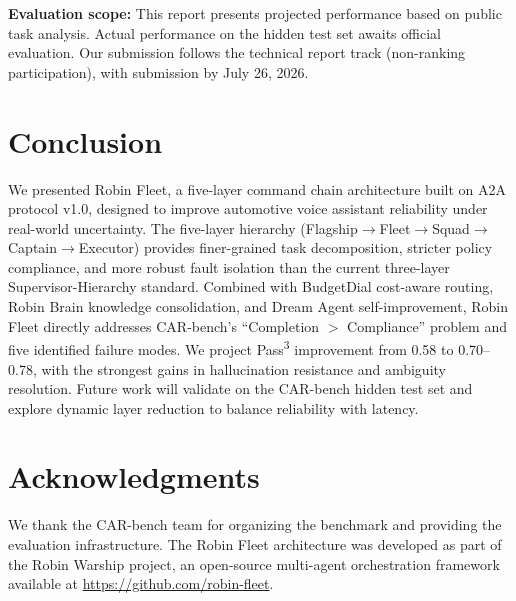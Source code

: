 \documentclass{article}
\begin{document}
\textbf{Evaluation scope:} This report presents projected performance based on public task analysis. Actual performance on the hidden test set awaits official evaluation. Our submission follows the technical report track (non-ranking participation), with submission by July 26, 2026.

\section{Conclusion}

We presented Robin Fleet, a five-layer command chain architecture built on A2A protocol v1.0, designed to improve automotive voice assistant reliability under real-world uncertainty. The five-layer hierarchy (Flagship$\rightarrow$Fleet$\rightarrow$Squad$\rightarrow$Captain$\rightarrow$Executor) provides finer-grained task decomposition, stricter policy compliance, and more robust fault isolation than the current three-layer Supervisor-Hierarchy standard. Combined with BudgetDial cost-aware routing, Robin Brain knowledge consolidation, and Dream Agent self-improvement, Robin Fleet directly addresses CAR-bench's ``Completion $>$ Compliance'' problem and five identified failure modes. We project Pass\textsuperscript{3} improvement from 0.58 to 0.70--0.78, with the strongest gains in hallucination resistance and ambiguity resolution. Future work will validate on the CAR-bench hidden test set and explore dynamic layer reduction to balance reliability with latency.

\section*{Acknowledgments}

We thank the CAR-bench team for organizing the benchmark and providing the evaluation infrastructure. The Robin Fleet architecture was developed as part of the Robin Warship project, an open-source multi-agent orchestration framework available at \url{https://github.com/robin-fleet}.



\end{document}
